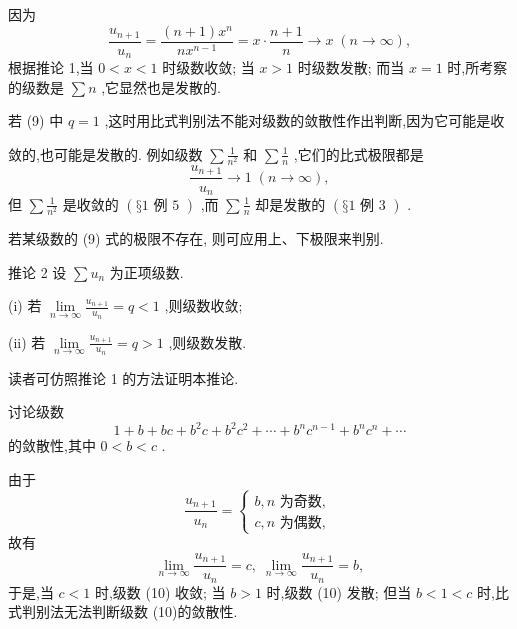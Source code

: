 \begin{solution}

\end{solution}
因为
\[
\frac{{u}_{n + 1}}{{u}_{n}} = \frac{\left( {n + 1}\right) {x}^{n}}{n{x}^{n - 1}} = x \cdot  \frac{n + 1}{n} \rightarrow  x\;\left( {n \rightarrow  \infty }\right) ,
\]
根据推论 1,当 \(0 < x < 1\) 时级数收敛; 当 \(x > 1\) 时级数发散; 而当 \(x = 1\) 时,所考察的级数是 \(\sum n\) ,它显然也是发散的.

若 (9) 中 \(q = 1\) ,这时用比式判别法不能对级数的敛散性作出判断,因为它可能是收

敛的,也可能是发散的. 例如级数 \(\sum \frac{1}{{n}^{2}}\) 和 \(\sum \frac{1}{n}\) ,它们的比式极限都是
\[
\frac{{u}_{n + 1}}{{u}_{n}} \rightarrow  1\;\left( {n \rightarrow  \infty }\right) ,
\]
但 \(\sum \frac{1}{{n}^{2}}\) 是收敛的 \(\left( {§1\text{ 例 5 }}\right)\) ,而 \(\sum \frac{1}{n}\) 却是发散的 \(\left( {§1\text{ 例 3 }}\right)\) .

若某级数的 (9) 式的极限不存在, 则可应用上、下极限来判别.

推论 2 设 \(\sum {u}_{n}\) 为正项级数.

(i) 若 \(\mathop{\lim }\limits_{{n \rightarrow  \infty }}\frac{{u}_{n + 1}}{{u}_{n}} = q < 1\) ,则级数收敛;

(ii) 若 \(\mathop{\lim }\limits_{{n \rightarrow  \infty }}\frac{{u}_{n + 1}}{{u}_{n}} = q > 1\) ,则级数发散.

读者可仿照推论 1 的方法证明本推论.

\begin{example}

\end{example}
讨论级数
\[
1 + b + {bc} + {b}^{2}c + {b}^{2}{c}^{2} + \cdots  + {b}^{n}{c}^{n - 1} + {b}^{n}{c}^{n} + \cdots  \tag{10}
\]
的敛散性,其中 \(0 < b < c\) .

\begin{solution}

\end{solution}
由于
\[
\frac{{u}_{n + 1}}{{u}_{n}} = \left\{  \begin{array}{l} b,n\text{ 为奇数, } \\  c,n\text{ 为偶数, } \end{array}\right.
\]
故有
\[
\mathop{\lim }\limits_{{n \rightarrow  \infty }}\frac{{u}_{n + 1}}{{u}_{n}} = c,\;\mathop{\lim }\limits_{{n \rightarrow  \infty }}\frac{{u}_{n + 1}}{{u}_{n}} = b,
\]
于是,当 \(c < 1\) 时,级数 (10) 收敛; 当 \(b > 1\) 时,级数 (10) 发散; 但当 \(b < 1 < c\) 时,比式判别法无法判断级数 (10)的敛散性.

